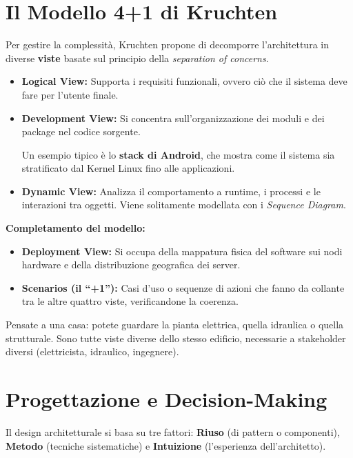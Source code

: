 \section{Il Modello 4+1 di Kruchten}
Per gestire la complessità, Kruchten propone di decomporre l'architettura in diverse \textbf{viste} basate sul principio della \textit{separation of concerns}.

\begin{itemize}
    \item \textbf{Logical View:} Supporta i requisiti funzionali, ovvero ciò che il sistema deve fare per l'utente finale.
    \item \textbf{Development View:} Si concentra sull'organizzazione dei moduli e dei package nel codice sorgente.
    \begin{notaprof}Un esempio tipico è lo \textbf{stack di Android}, che mostra come il sistema sia stratificato dal Kernel Linux fino alle applicazioni.\end{notaprof}
    \item \textbf{Dynamic View:} Analizza il comportamento a runtime, i processi e le interazioni tra oggetti. Viene solitamente modellata con i \textit{Sequence Diagram}.
\end{itemize}

\begin{notaslide}
\textbf{Completamento del modello:}
\begin{itemize}
    \item \textbf{Deployment View:} Si occupa della mappatura fisica del software sui nodi hardware e della distribuzione geografica dei server.
    \item \textbf{Scenarios (il ``+1''):} Casi d'uso o sequenze di azioni che fanno da collante tra le altre quattro viste, verificandone la coerenza.
\end{itemize}
\end{notaslide}

\begin{notaprof}
Pensate a una casa: potete guardare la pianta elettrica, quella idraulica o quella strutturale. Sono tutte viste diverse dello stesso edificio, necessarie a stakeholder diversi (elettricista, idraulico, ingegnere).
\end{notaprof}

\section{Progettazione e Decision-Making}
Il design architetturale si basa su tre fattori: \textbf{Riuso} (di pattern o componenti), \textbf{Metodo} (tecniche sistematiche) e \textbf{Intuizione} (l'esperienza dell'architetto).

